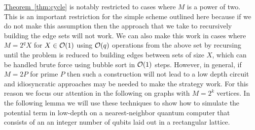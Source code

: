 \documentclass[superscriptaddress,aps,pra,nofootinbib,notitlepage,10pt,longbibliography]{revtex4-1}
\newcommand{\thm}[1]{\hyperref[thm:#1]{Theorem~\ref*{thm:#1}}}
\begin{document}
\thm{cycle} is notably restricted to cases where $M$ is a power of two.  This is an important restriction for the simple scheme outlined here because if we do not make this assumption then the approach that we take to recursively building the edge sets will not work.  We can also make this work in cases where $M = 2^q X$ for $X\in {\cal O}(1)$ using ${\cal O}(q)$ operations from the above set by recursing until the problem is reduced to building edges between sets of size $X$, which can be handled brute force using bubble sort in ${\cal O}(1)$ steps.  However, in general, if $M=2P$ for prime $P$ then such a construction will not lead to a low depth circuit and idiosyncratic approaches may be needed to make the strategy work. For this reason we focus our attention in the following on graphs with $M=2^k$ vertices. In the following lemma we will use these techniques to show how to simulate the potential term in low-depth on a nearest-neighbor quantum computer that consists of an an integer number of qubits laid out in a rectangular lattice.
\end{document}

